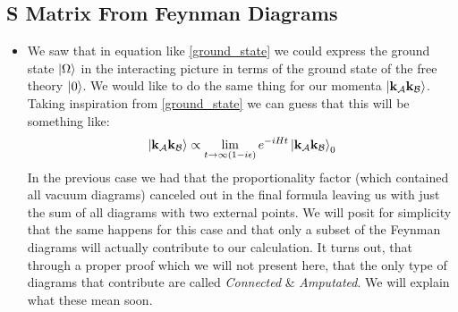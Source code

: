 \documentclass[11pt]{article}
\numberwithin{equation}{section}
\begin{document}
\subsection{S Matrix From Feynman Diagrams} %
\label{sub:s_matrix_from_feynman_diagrams}
\begin{itemize}
  \item We saw that in equation like \ref{ground_state} we could express the ground state $\ket{\Omega}$ in the interacting picture in terms of the ground state of the free theory $\ket{0}$. We would like to do the same thing for our momenta $\ket{\textbf{k}_{\mathcal{A}}\textbf{k}_{\mathcal{B}}}$. Taking inspiration from \ref{ground_state} we can guess that this will be something like:
  \begin{align}
  \label{k_limit}
    \ket{\textbf{k}_{\mathcal{A}}\textbf{k}_{\mathcal{B}}} \propto \lim_{t\rightarrow\infty(1-i\epsilon)}e^{-iHt}\ket{\textbf{k}_{\mathcal{A}}\textbf{k}_{\mathcal{B}}}_0
  \end{align}
  In the previous case we had that the proportionality factor (which contained all vacuum diagrams) canceled out in the final formula leaving us with just the sum of all diagrams with two external points. We will posit for simplicity that the same happens for this case and that only a subset of the Feynman diagrams will actually contribute to our calculation. It turns out, that through a proper proof which we will not present here, that the only type of diagrams that contribute are called \emph{Connected } \& \emph{ Amputated}. We will explain what these mean soon. 


\end{itemize}
\end{document}
